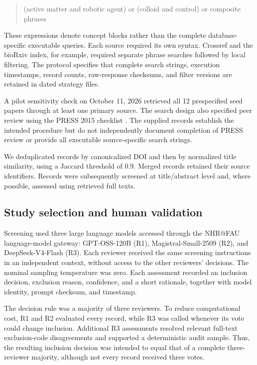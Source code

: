 \begin{quote}
\raggedright\small
(active matter and robotic agent)
or (colloid and control)
or composite phrases
\end{quote}

These expressions denote concept blocks rather than the complete
database-specific executable queries. Each source required its own
syntax. Crossref and the bioRxiv index, for example, required
separate phrase searches followed by local filtering.
The protocol specifies that complete search strings, execution
timestamps, record counts, raw-response checksums, and filter versions
are retained in dated strategy files.

A pilot sensitivity check on October 11, 2026 retrieved all
12 prespecified seed papers through at least one primary source.
The search design also specified peer review using the PRESS 2015
checklist \cite{McGowan2016press}. The supplied records establish the intended
procedure but do not independently document completion of PRESS
review or provide all executable source-specific search strings.

We deduplicated records by canonicalized DOI and then by normalized
title similarity, using a Jaccard threshold of 0.9.
Merged records retained their source identifiers. Records were
subsequently screened at title/abstract level and, where possible,
assessed using retrieved full texts.

\subsection{Study selection and human validation}
\label{sec:methods-screening}

Screening used three large language models accessed through the
NHR@FAU language-model gateway: GPT-OSS-120B (R1),
Magistral-Small-2509 (R2), and DeepSeek-V4-Flash (R3).
Each reviewer received the same screening instructions in an
independent context, without access to the other reviewers'
decisions. The nominal sampling temperature was zero.
Each assessment recorded an inclusion decision, exclusion reason,
confidence, and a short rationale, together with model identity,
prompt checksum, and timestamp.

The decision rule was a majority of three reviewers. To reduce
computational cost, R1 and R2 evaluated every record, while R3
was called whenever its vote could change inclusion.
Additional R3 assessments resolved relevant full-text
exclusion-code disagreements and supported a deterministic audit
sample. Thus, the resulting inclusion decision was intended to
equal that of a complete three-reviewer majority, although not
every record received three votes.

